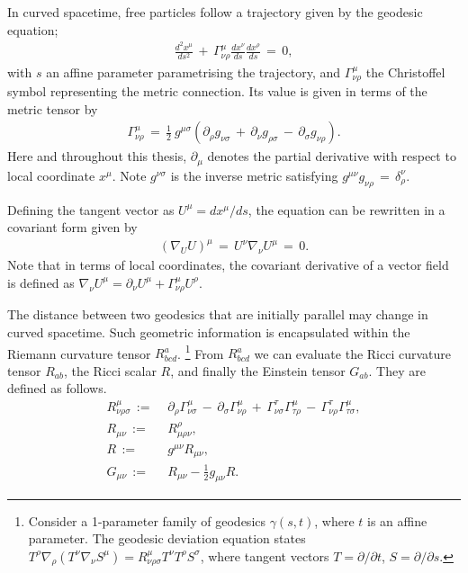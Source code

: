 In curved spacetime, free particles follow a trajectory given by the geodesic equation;
\begin{align}
	\frac{d^2x^\mu}{ds^2} \,+\, \Gamma^\mu_{\nu \rho} \frac{dx^\nu}{ds} \frac{dx^\rho}{ds} \,=\, 0,  \label{eqn:geodesic}
\end{align}
with $s$ an affine parameter parametrising the trajectory, and $\Gamma^\mu_{\nu\rho}$ the Christoffel symbol representing the metric connection. Its value is given in terms of the metric tensor by
\begin{align}
	\Gamma^{\mu}_{\nu\rho} \,=\, \frac{1}{2}~ g^{\mu\sigma} \left( \partial_\rho g_{\nu\sigma} \,+\, \partial_\nu g_{\rho\sigma} \,-\, \partial_\sigma g_{\nu\rho}  \right). \label{def:Levi_Civita}
\end{align}
Here and throughout this thesis, $\partial_\mu$ denotes the partial derivative with respect to local coordinate $x^\mu$. Note $g^{\nu\sigma}$ is the inverse metric satisfying $g^{\mu\nu} g_{\nu\rho} \,=\, \delta^\nu_\rho$.

Defining the tangent vector as $U^\mu = dx^\mu / ds$, the equation can be rewritten in a covariant form given by
\begin{align}
	\left( \nabla_U U \right)^\mu \,=\, U^\nu \nabla_\nu U^\mu \,=\, 0. \label{eqn:geodesic_covariant}
\end{align}
Note that in terms of local coordinates, the covariant derivative of a vector field is defined as $\nabla_\nu U^\mu = \partial_\nu U^\mu + \Gamma^\mu_{\nu\rho} U^\rho$.

The distance between two geodesics that are initially parallel may change in curved spacetime. Such geometric information is encapsulated within the Riemann curvature tensor $R^a_{bcd}$. \footnote{Consider a 1-parameter family of geodesics $\gamma(s,t)$, where $t$ is an affine parameter. The geodesic deviation equation states $T^\rho \nabla_\rho ( T^\nu \nabla_\nu S^\mu ) = R^\mu_{\nu\rho\sigma} T^\nu T^\rho S^\sigma$, where tangent vectors $T=\partial/\partial t$, $S=\partial/\partial s$.} From $R^a_{bcd}$ we can evaluate the Ricci curvature tensor $R_{ab}$, the Ricci scalar $R$, and finally the Einstein tensor $G_{ab}$. They are defined as follows.
\begin{align}
	R^\mu_{\nu\rho\sigma} \,:=& \,\, \partial_\rho \Gamma^\mu_{\nu\sigma} \,-\, \partial_\sigma \Gamma^\mu_{\nu\rho} \,+\, \Gamma^\tau_{\nu\sigma} \Gamma^\mu_{\tau\rho} \,-\, \Gamma^\tau_{\nu\rho} \Gamma^\mu_{\tau\sigma},  \label{def:Riemann_tensor}\\
	R_{\mu\nu} \,:=& \,\, R^\rho_{\mu\rho\nu},  \\ %
	R \,:=& \,\, g^{\mu\nu} R_{\mu\nu}, \\
	G_{\mu\nu} \,:=& \,\, R_{\mu\nu} - \frac{1}{2} g_{\mu\nu} R. \label{def:Einstein_tensor}
\end{align}

